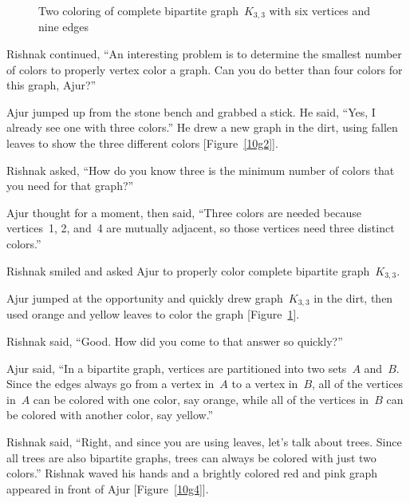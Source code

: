 \begin{figure}
\begin{center}
\caption{Two coloring of complete bipartite graph~$K_{3,3}$ with six vertices and nine edges}\label{10g3}
\end{center}
\end{figure}

Rishnak continued, ``An interesting problem is to determine the smallest number of colors to properly vertex color a graph. Can you do better than four colors for this graph, Ajur?''

Ajur jumped up from the stone bench and grabbed a stick. He said, ``Yes, I already see one with three colors.'' He drew a new graph in the dirt, using fallen leaves to show the three different colors [Figure~\ref{10g2}].

Rishnak asked, ``How do you know three is the minimum number of colors that you need for that graph?''

Ajur thought for a moment, then said, ``Three colors are needed because vertices~1, 2, and~4 are mutually adjacent, so those vertices need three distinct colors.''

Rishnak smiled and asked Ajur to properly color complete bipartite graph~$K_{3,3}$.

Ajur jumped at the opportunity and quickly drew graph~$K_{3,3}$ in the dirt, then used orange and yellow leaves to color the graph [Figure~\ref{10g3}].

Rishnak said, ``Good. How did you come to that answer so quickly?''

Ajur said, ``In a bipartite graph, vertices are partitioned into two sets~$A$ and~$B$. Since the edges always go from a vertex in~$A$ to a vertex in~$B$, all of the vertices in~$A$ can be colored with one color, say orange, while all of the vertices in~$B$ can be colored with another color, say yellow.''

Rishnak said, ``Right, and since you are using leaves, let's talk about trees. Since all trees are also bipartite graphs, trees can always be colored with just two colors.'' Rishnak waved his hands and a brightly colored red and pink graph appeared in front of Ajur [Figure~\ref{10g4}].

